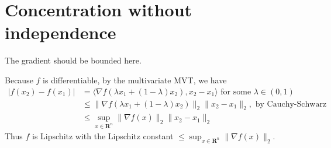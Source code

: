 \documentclass[11pt]{article}
\newcommand{\R}{\mathbf{R}}
\newcommand{\inp}[2]{\langle #1, #2 \rangle}
\newcommand{\nm}[1]{\lVert #1 \rVert}
\newcommand{\abs}[1]{\lvert #1 \rvert}
\theoremstyle{plain}
\theoremstyle{definition}
\theoremstyle{remark}
\theoremstyle{definition}
\newenvironment{mansol}[1]{%
  \renewcommand\themansolinner{#1}%
  \mansolinner
}{\endmansolinner}
\begin{document}
\newpage

\section{Concentration without independence}
\begin{mansol}{5.1.2 (b)} The gradient should be bounded here.

Because $f$ is differentiable, by the multivariate MVT, we have \begin{align*}
\abs{f(x_2) - f(x_1)} & = \inp{\nabla f(\lambda x_1 + (1-\lambda) x_2)}{x_2 - x_1} \text{ for some }\lambda \in (0,1) \\ 
& \leq \nm{\nabla f(\lambda x_1 + (1-\lambda) x_2)}_2 \nm{x_2 - x_1}_2, \text{ by Cauchy-Schwarz} \\ 
& \leq \sup_{x \in \R^n}\nm{\nabla f(x)}_2 \nm{x_2 - x_1}_2
\end{align*}
Thus $f$ is Lipschitz with the Lipschitz constant $\leq \sup_{x \in \R^n}\nm{\nabla f(x)}_2$.
\end{mansol}
\end{document}

